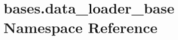 \hypertarget{namespacebases_1_1data__loader__base}{}\section{bases.\+data\+\_\+loader\+\_\+base Namespace Reference}
\label{namespacebases_1_1data__loader__base}
